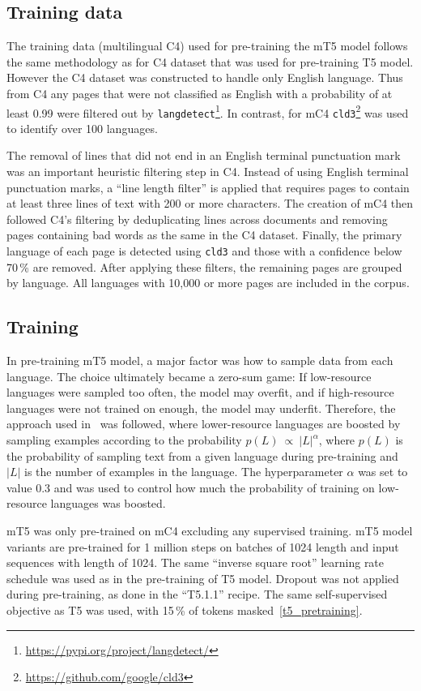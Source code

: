 \subsection*{Training data}
The training data (multilingual C4) used for pre-training the mT5 model follows the same methodology as for C4 dataset that was used for pre-training T5 model. However the C4 dataset was constructed to handle only English language. Thus from C4 any pages that were not classified as English with a probability of at least 0.99 were filtered out by \texttt{langdetect}\footnote{\url{https://pypi.org/project/langdetect/}}. In contrast, for mC4 \texttt{cld3}\footnote{\url{https://github.com/google/cld3}} was used to identify over 100 languages.

The removal of lines that did not end in an English terminal punctuation mark was an important heuristic filtering step in C4. Instead of using English terminal punctuation marks, a ``line length filter'' is applied that requires pages to contain at least three lines of text with 200 or more characters. The creation of mC4 then followed C4's filtering by deduplicating lines across documents and removing pages containing bad words as the same in the C4 dataset. Finally, the primary language of each page is detected using \texttt{cld3} and those with a confidence below 70\,\% are removed. After applying these filters, the remaining pages are grouped by language. All languages with 10,000 or more pages are included in the corpus.

\subsection*{Training}
In pre-training mT5 model, a major factor was how to sample data from each language. The choice ultimately became a zero-sum game: If low-resource languages were sampled too often, the model may overfit, and if high-resource languages were not trained on enough, the model may underfit. Therefore, the approach used in~\cite{mt5_approach}\cite{mt5_approach2} was followed, where lower-resource languages are boosted by sampling examples according to the probability $p(L)~\propto~|L|^\alpha$, where $p(L)$ is the probability of sampling text from a given language during pre-training and $|L|$ is the number of examples in the language. The hyperparameter $\alpha$ was set to value 0.3 and was used to control how much the probability of training on low-resource languages was boosted.

mT5 was only pre-trained on mC4 excluding any supervised training. mT5 model variants are pre-trained for 1 million steps on batches of 1024 length and input sequences with length of 1024. The same ``inverse square root'' learning rate schedule was used as in the pre-training of T5 model. Dropout was not applied during pre-training, as done in the ``T5.1.1'' recipe. The same self-supervised objective as T5 was used, with 15\,\% of tokens masked~\ref{t5_pretraining}.

